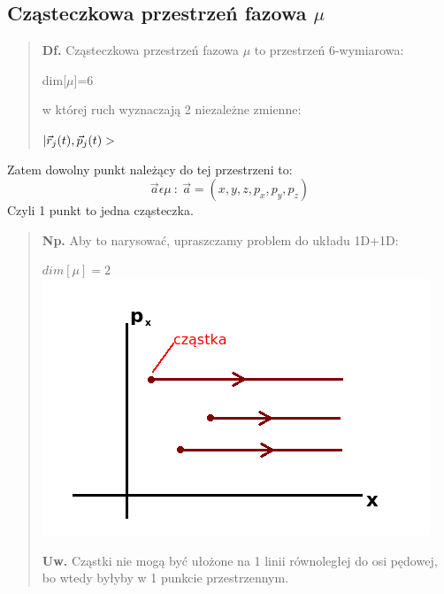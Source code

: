 \subsection{Cząsteczkowa przestrzeń fazowa $\mu$}
\begin{verse}\textbf{Df.} Cząsteczkowa przestrzeń fazowa $\mu$ to przestrzeń 6-wymiarowa:\\
\begin{center}dim[$\mu$]=6 \end{center}
w której ruch wyznaczają 2 niezależne zmienne:\\
\begin{center}$|\vec{r}_j(t),\vec{p}_j(t)>$\end{center}\end{verse}
Zatem dowolny punkt należący do tej przestrzeni to:
\begin{equation}\vec{a}\epsilon\mu~:~\vec{a}=(x,y,z,p_x,p_y,p_z)\end{equation}
Czyli 1 punkt to jedna cząsteczka.
\begin{verse}\textbf{Np.} Aby to narysować, upraszczamy problem do układu 1D+1D:\\
\begin{center}$dim[\mu]=2$\\
\includegraphics[scale=0.75] {obrazki/przestrzen_fazowa1.png}
\end{center}
\textbf{Uw.} Cząstki nie mogą być ułożone na 1 linii równoległej do osi pędowej, bo wtedy byłyby w 1 punkcie przestrzennym.
\end{verse}
